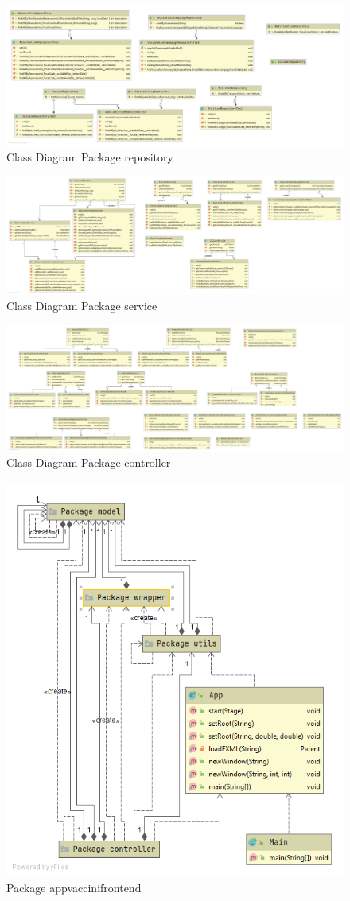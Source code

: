 \documentclass[a4paper,12pt,openany,oneside]{book}
\begin{document}
\begin{figure}[h] 
\centering
\includegraphics[width=0.8\columnwidth]{Package repository.png} 
\caption{Class Diagram Package repository} 
\end{figure}
\begin{figure}[h] 
\centering
\includegraphics[width=1.2\columnwidth]{Package service.png} 
\caption{Class Diagram  Package service} 
\end{figure}
\begin{figure}[h] 
\includegraphics[width=1.2\columnwidth]{Package controller.png} 
\caption{Class Diagram Package controller} 
\end{figure}

\begin{figure}[h] 
\centering
\includegraphics[width=0.6\columnwidth]{Package kodikasgroup Frontend.png} 
\caption{Package appvaccinifrontend} 
\end{figure}
\end{document}
